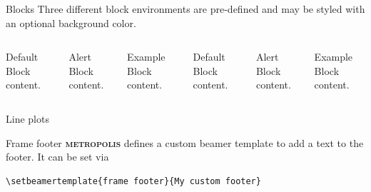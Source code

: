 \documentclass[10pt]{beamer}
\newcommand{\themename}{\textbf{\textsc{metropolis}}\xspace}
\begin{document}
\begin{frame}{Blocks}
  Three different block environments are pre-defined and may be styled with an
  optional background color.

  \begin{columns}[T,onlytextwidth]
      \begin{block}{Default}
        Block content.
      \end{block}

      \begin{alertblock}{Alert}
        Block content.
      \end{alertblock}

      \begin{exampleblock}{Example}
        Block content.
      \end{exampleblock}



      \begin{block}{Default}
        Block content.
      \end{block}

      \begin{alertblock}{Alert}
        Block content.
      \end{alertblock}

      \begin{exampleblock}{Example}
        Block content.
      \end{exampleblock}

  \end{columns}
\end{frame}

\begin{frame}{Line plots}
  \begin{figure}
  \end{figure}
\end{frame}

{%
\begin{frame}[fragile]{Frame footer}
    \themename defines a custom beamer template to add a text to the footer. It can be set via
    \begin{verbatim}\setbeamertemplate{frame footer}{My custom footer}\end{verbatim}
\end{frame}
}
\end{document}
